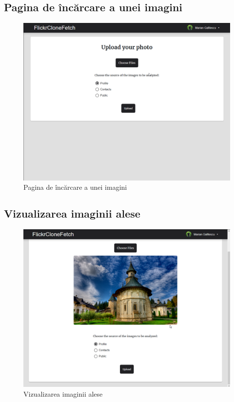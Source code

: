 \pagebreak
\subsection{Pagina de încărcare a unei imagini}

\begin{figure}[!htbp]
    \begin{center}
        \includegraphics[width=1.0\textwidth]{images/choose.png}
        \caption{Pagina de încărcare a unei imagini}
    \end{center}
\end{figure}


\pagebreak
\subsection{Vizualizarea imaginii alese}

\begin{figure}[!htbp]
    \begin{center}
        \includegraphics[width=1.0\textwidth]{images/preview.png}
        \caption{Vizualizarea imaginii alese }
    \end{center}
\end{figure}



